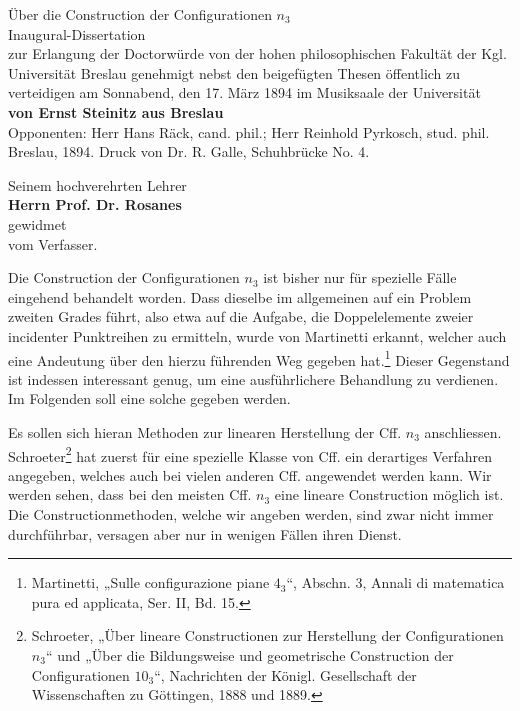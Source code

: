 \documentclass[11pt]{article}
\begin{document}
\begin{center}
{\Large Über die Construction der Configurationen $n_3$}\\[0.5em]
{\large Inaugural-Dissertation}\\[0.5em]
zur Erlangung der Doctorwürde von der hohen philosophischen Fakultät der Kgl. Universität Breslau genehmigt nebst den beigefügten Thesen öffentlich zu verteidigen am Sonnabend, den 17. März 1894 im Musiksaale der Universität\\[0.5em]
\textbf{von Ernst Steinitz aus Breslau}\\[0.5em]
Opponenten: Herr Hans Räck, cand. phil.; Herr Reinhold Pyrkosch, stud. phil.\\[0.5em]
Breslau, 1894. Druck von Dr. R. Galle, Schuhbrücke No. 4.
\end{center}

\begin{center}
Seinem hochverehrten Lehrer\\[0.3em]
\textbf{Herrn Prof. Dr. Rosanes}\\[0.3em]
gewidmet\\[1em]
\hfill vom Verfasser.
\end{center}

Die Construction der Configurationen $n_3$ ist bisher nur für spezielle Fälle eingehend behandelt worden. Dass dieselbe im allgemeinen auf ein Problem zweiten Grades führt, also etwa auf die Aufgabe, die Doppelelemente zweier incidenter Punktreihen zu ermitteln, wurde von Martinetti erkannt, welcher auch eine Andeutung über den hierzu führenden Weg gegeben hat.\footnote{Martinetti, „Sulle configurazione piane $4_3$“, Abschn. 3, Annali di matematica pura ed applicata, Ser. II, Bd. 15.} Dieser Gegenstand ist indessen interessant genug, um eine ausführlichere Behandlung zu verdienen. Im Folgenden soll eine solche gegeben werden.

Es sollen sich hieran Methoden zur linearen Herstellung der Cff. $n_3$ anschliessen. Schroeter\footnote{Schroeter, „Über lineare Constructionen zur Herstellung der Configurationen $n_3$“ und „Über die Bildungsweise und geometrische Construction der Configurationen $10_3$“, Nachrichten der Königl. Gesellschaft der Wissenschaften zu Göttingen, 1888 und 1889.} hat zuerst für eine spezielle Klasse von Cff. ein derartiges Verfahren angegeben, welches auch bei vielen anderen Cff. angewendet werden kann. Wir werden sehen, dass bei den meisten Cff. $n_3$ eine lineare Construction möglich ist. Die Constructionmethoden, welche wir angeben werden, sind zwar nicht immer durchführbar, versagen aber nur in wenigen Fällen ihren Dienst.
\end{document}
